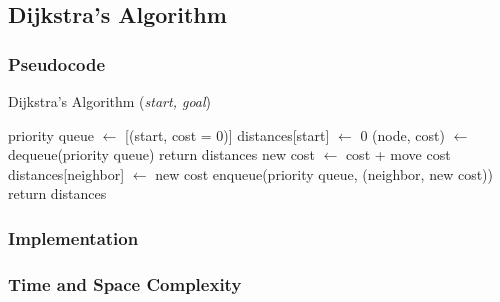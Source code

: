 \subsection{Dijkstra's Algorithm}

\subsubsection{Pseudocode}
\begin{algorithm}[H]
	\caption{Dijkstra's Algorithm (\textit{start, goal})}
	\label{alg:dijkstra}
	\begin{algorithmic}[1]
	\State priority queue \(\gets\) [(start, cost = 0)]
	\State distances[start] \(\gets\) 0
		\State (node, cost) \(\gets\) dequeue(priority queue)
			\State return distances
		\EndIf
			\State new cost \(\gets\) cost + move cost
				\State distances[neighbor] \(\gets\) new cost
				\State enqueue(priority queue, (neighbor, new cost))
			\EndIf
		\EndFor
	\EndWhile
	\State return distances
	\end{algorithmic}
\end{algorithm}

\subsubsection{Implementation}

\subsubsection{Time and Space Complexity}

